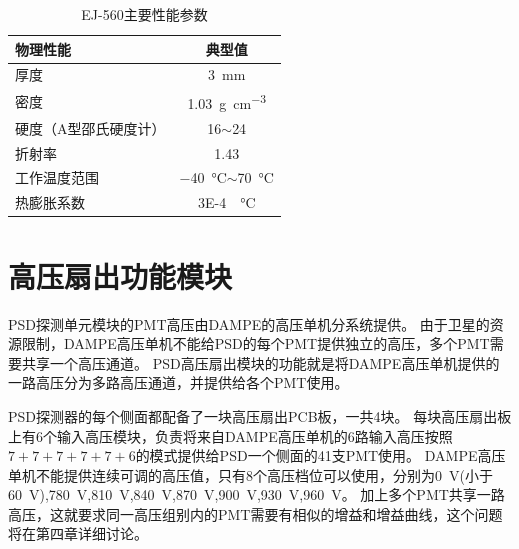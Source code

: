 \begin{table}[htb]
	\centering
	\caption{EJ-560主要性能参数}
	\label{tab:ch2:ej560}
	
	\begin{tabulary}{0.6\linewidth}{LC}
		\toprule[1.5pt]
		\textbf{物理性能} & \textbf{典型值}                              \\ 
		\midrule[1pt]
		厚度            & \SI{3}{\milli\meter}                      \\
		密度            & \SI{1.03}{\g\per\cubic\centi\meter}       \\
		硬度（A型邵氏硬度计）   & 16$\sim$24                                \\
		折射率           & 1.43                                      \\
		工作温度范围        & \SI{-40}{\celsius}$\sim$\SI{70}{\celsius} \\
		热膨胀系数         & \SI{3E-4}{\per\celsius}                   \\ 
		\bottomrule[1.5pt]
	\end{tabulary}
	
\end{table}

\section{高压扇出功能模块}
\label{sec:psd_hv}
PSD探测单元模块的PMT高压由DAMPE的高压单机分系统提供。
由于卫星的资源限制，DAMPE高压单机不能给PSD的每个PMT提供独立的高压，多个PMT需要共享一个高压通道。
PSD高压扇出模块的功能就是将DAMPE高压单机提供的一路高压分为多路高压通道，并提供给各个PMT使用。

PSD探测器的每个侧面都配备了一块高压扇出PCB板，一共4块。
每块高压扇出板上有6个输入高压模块，负责将来自DAMPE高压单机的6路输入高压按照$7+7+7+7+7+6$的模式提供给PSD一个侧面的41支PMT使用。
DAMPE高压单机不能提供连续可调的高压值，只有8个高压档位可以使用，分别为\SI{0}{V}(小于\SI{60}{V}),\SI{780}{V},\SI{810}{V},\SI{840}{V},\SI{870}{V},\SI{900}{V},\SI{930}{V},\SI{960}{\volt}。
加上多个PMT共享一路高压，这就要求同一高压组别内的PMT需要有相似的增益和增益曲线，这个问题将在第四章详细讨论。

